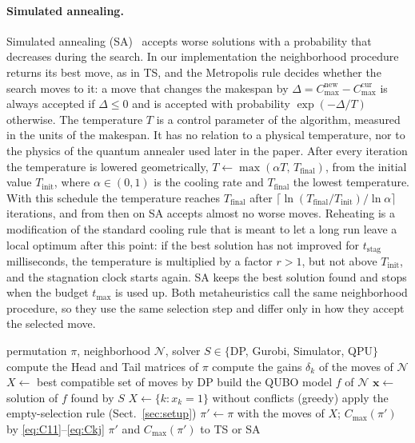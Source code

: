 \documentclass[10pt,twoside,twocolumn,a4paper]{article}
\newif\ifrevmarks \revmarksfalse
\newcommand{\rev}[1]{\ifrevmarks\textcolor{red}{#1}\else#1\fi}
\newenvironment{revblock}{\ifrevmarks\color{red}\fi}{}
\begin{document}
\begin{revblock}
\paragraph{Simulated annealing.}
Simulated annealing (SA)~\cite{kirkpatrick1983optimization,OsmanPotts1989} accepts worse solutions with a probability that decreases during the search. In our implementation the neighborhood procedure returns its best move, as in TS, and the Metropolis rule decides whether the search moves to it: a move that changes the makespan by $\Delta=C_{\max}^{\text{new}}-C_{\max}^{\text{cur}}$ is always accepted if $\Delta\le 0$ and is accepted with probability $\exp(-\Delta/T)$ otherwise. The temperature $T$ is a control parameter of the algorithm, measured in the units of the makespan. It has no relation to a physical temperature, nor to the physics of the quantum annealer used later in the paper. After every iteration the temperature is lowered geometrically, $T\leftarrow\max(\alpha T,\,T_{\text{final}})$, from the initial value $T_{\text{init}}$, where $\alpha\in(0,1)$ is the cooling rate and $T_{\text{final}}$ the lowest temperature. With this schedule the temperature reaches $T_{\text{final}}$ after $\lceil\ln(T_{\text{final}}/T_{\text{init}})/\ln\alpha\rceil$ iterations, and from then on SA accepts almost no worse moves. Reheating is a modification of the standard cooling rule that is meant to let a long run leave a local optimum after this point: if the best solution has not improved for $t_{\text{stag}}$ milliseconds, the temperature is multiplied by a factor $r>1$, but not above $T_{\text{init}}$, and the stagnation clock starts again. SA keeps the best solution found and stops when the budget $t_{\max}$ is used up. Both metaheuristics call the same neighborhood procedure, so they use the same selection step and differ only in how they accept the selected move.
\end{revblock}

\begin{algorithm}[t]
\ifrevmarks\color{red}\fi\footnotesize
\caption{\rev{One iteration of the neighborhood procedure.}}\label{alg:iteration}
\begin{algorithmic}[1]
\Require permutation $\pi$, neighborhood $\mathcal{N}$, solver $S\in\{$DP, Gurobi, Simulator, QPU$\}$
\State compute the Head and Tail matrices of $\pi$ 
\State compute the gains $\delta_k$ of the moves of $\mathcal{N}$ 
  \State $X\gets$ best compatible set of moves by DP 
\Else
  \State build the QUBO model $f$ of $\mathcal{N}$ 
  \State $\mathbf{x}\gets$ solution of $f$ found by $S$ 
  \State $X\gets\{k : x_k=1\}$ without conflicts (greedy) 
\EndIf
{} apply the empty-selection rule (Sect.~\ref{sec:setup}) \EndIf
\State $\pi'\gets\pi$ with the moves of $X$; $C_{\max}(\pi')$ by \eqref{eq:C11}--\eqref{eq:Ckj} 
\State \Return $\pi'$ and $C_{\max}(\pi')$ to TS or SA
\end{algorithmic}
\end{algorithm}
\end{document}
